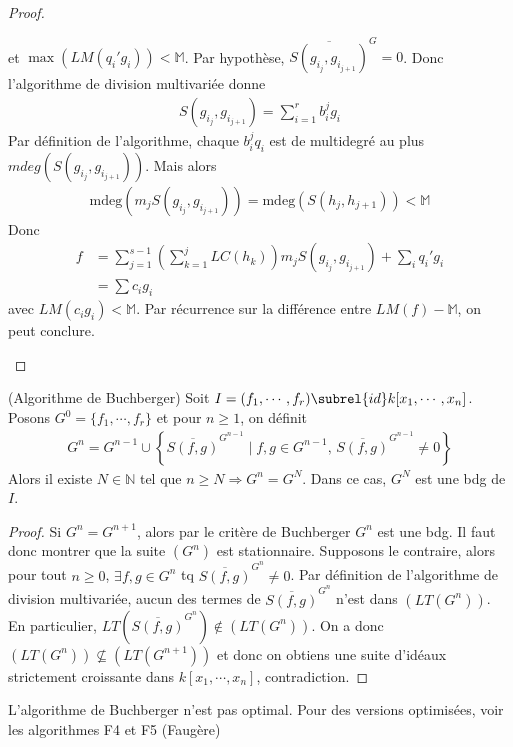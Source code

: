 \begin{proof}
\begin{enumerate}
                    et $\max (LM(q_i'g_i)) < \mathbb{M}$. Par hypothèse, $\overline{S(g_{i_j}, g_{i_{j+1}})}^G = 0$. Donc l'algorithme de division multivariée donne 
                    \begin{align*}
                        S(g_{i_j}, g_{i_{j+1}}) = \sum_{i = 1}^r b_i^jg_i
                    \end{align*}
                    Par définition de l'algorithme, chaque $b_i^jq_i$ est de multidegré au plus $mdeg(S(g_{i_j}, g_{i_{j+1}}))$. Mais alors
                    \begin{align*}
                        \mathrm{mdeg}(m_j S(g_{i_j}, g_{i_{j+1}})) = \mathrm{mdeg}(S(h_j,h_{j+1})) < \mathbb{M}
                    \end{align*}
                    Donc
                    \begin{align*}
                        f &= \sum_{j = 1}^{s-1} \left(\sum_{k = 1}^j LC(h_k) \right) m_j S(g_{i_j},g_{i_{j+1}}) + \sum_i q_i'g_i \\        
                        &= \sum c_ig_i                
                    \end{align*}
                    avec $LM(c_ig_i) < \mathbb{M}$. Par récurrence sur la différence entre $LM(f) - \mathbb{M}$, on peut conclure.
                \end{enumerate}
            \end{proof}
            \begin{coro} (Algorithme de Buchberger)
                Soit $I = (f_1, \cdots, f_r) \subrel{id} k[x_1, \cdots, x_n]$. Posons $G^0 = \{f_1, \cdots, f_r\}$ et pour $n \geq 1$, on définit
                \begin{align*}
                    G^n = G^{n-1} \cup \left\{\overline{S(f,g)}^{G^{n-1}} \mid f,g \in G^{n-1},\, \overline{S(f,g)}^{G^{n-1}} \neq 0\right\} 
                \end{align*}
                Alors il existe $N \in \mathbb{N}$ tel que $n \geq N \Rightarrow G^n = G^N$. Dans ce cas, $G^N$ est une bdg de $I$.
            \end{coro}
            \begin{proof}
                Si $G^n = G^{n+1}$, alors par le critère de Buchberger $G^n$ est une bdg. Il faut donc montrer que la suite $(G^n)$ est stationnaire. Supposons le contraire, alors pour tout $n \geq 0$, $\exists f,g \in G^n$ tq $\overline{S(f,g)}^{G^n} \neq 0$. Par définition de l'algorithme de division multivariée, aucun des termes de $\overline{S(f,g)}^{G^n}$ n'est dans $(LT(G^n))$. En particulier, $LT(\overline{S(f,g)}^{G^n}) \notin (LT(G^n))$. On a donc $(LT(G^n)) \nsubseteq (LT(G^{n+1}))$ et donc on obtiens une suite d'idéaux strictement croissante dans $k[x_1, \cdots, x_n]$, contradiction.
            \end{proof}
            \begin{remq}
                L'algorithme de Buchberger n'est pas optimal. Pour des versions optimisées, voir les algorithmes F4 et F5 (Faugère)
            \end{remq}

